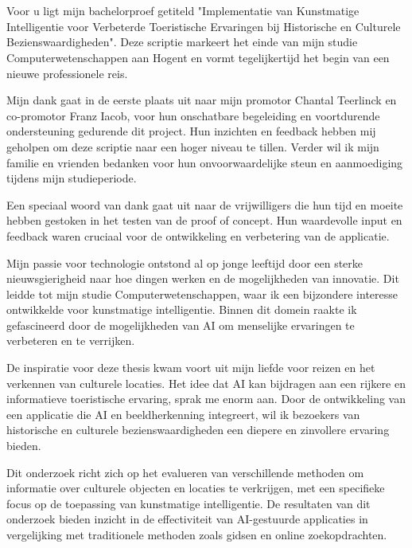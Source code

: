 


\chapter*{}%
\label{ch:voorwoord}

Voor u ligt mijn bachelorproef getiteld "Implementatie van Kunstmatige Intelligentie voor Verbeterde Toeristische Ervaringen bij Historische en Culturele Bezienswaardigheden". Deze scriptie markeert het einde van mijn studie Computerwetenschappen aan Hogent en vormt tegelijkertijd het begin van een nieuwe professionele reis.

Mijn dank gaat in de eerste plaats uit naar mijn promotor Chantal Teerlinck en co-promotor Franz Iacob, voor hun onschatbare begeleiding en voortdurende ondersteuning gedurende dit project. Hun inzichten en feedback hebben mij geholpen om deze scriptie naar een hoger niveau te tillen. Verder wil ik mijn familie en vrienden bedanken voor hun onvoorwaardelijke steun en aanmoediging tijdens mijn studieperiode.

Een speciaal woord van dank gaat uit naar de vrijwilligers die hun tijd en moeite hebben gestoken in het testen van de proof of concept. Hun waardevolle input en feedback waren cruciaal voor de ontwikkeling en verbetering van de applicatie.

Mijn passie voor technologie ontstond al op jonge leeftijd door een sterke nieuwsgierigheid naar hoe dingen werken en de mogelijkheden van innovatie. Dit leidde tot mijn studie Computerwetenschappen, waar ik een bijzondere interesse ontwikkelde voor kunstmatige intelligentie. Binnen dit domein raakte ik gefascineerd door de mogelijkheden van AI om menselijke ervaringen te verbeteren en te verrijken.

De inspiratie voor deze thesis kwam voort uit mijn liefde voor reizen en het verkennen van culturele locaties. Het idee dat AI kan bijdragen aan een rijkere en informatieve toeristische ervaring, sprak me enorm aan. Door de ontwikkeling van een applicatie die AI en beeldherkenning integreert, wil ik bezoekers van historische en culturele bezienswaardigheden een diepere en zinvollere ervaring bieden.

Dit onderzoek richt zich op het evalueren van verschillende methoden om informatie over culturele objecten en locaties te verkrijgen, met een specifieke focus op de toepassing van kunstmatige intelligentie. De resultaten van dit onderzoek bieden inzicht in de effectiviteit van AI-gestuurde applicaties in vergelijking met traditionele methoden zoals gidsen en online zoekopdrachten.

